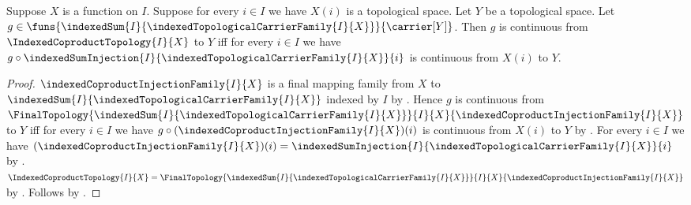 \begin{theorem}\label{indexed_coproduct_topology_universal_property}
    Suppose $X$ is a function on $I$.
    Suppose for every $i\in I$ we have $X(i)$ is a topological space.
    Let $Y$ be a topological space.
    Let $g\in\funs{
        \indexedSum{I}{\indexedTopologicalCarrierFamily{I}{X}}}{
        \carrier[Y]}$.
    Then $g$ is continuous from $\IndexedCoproductTopology{I}{X}$ to $Y$
        iff for every $i\in I$ we have
            $g\circ\indexedSumInjection{I}{
                \indexedTopologicalCarrierFamily{I}{X}}{i}$
            is continuous from $X(i)$ to $Y$.
\end{theorem}
\begin{proof}
    $\indexedCoproductInjectionFamily{I}{X}$ is a final mapping family
        from $X$ to
        $\indexedSum{I}{\indexedTopologicalCarrierFamily{I}{X}}$
        indexed by $I$ by .
    Hence $g$ is continuous from
        $\FinalTopology{
            \indexedSum{I}{
                \indexedTopologicalCarrierFamily{I}{X}}}{I}{X}{
            \indexedCoproductInjectionFamily{I}{X}}$ to $Y$ iff
        for every $i\in I$ we have
            $g\circ(\indexedCoproductInjectionFamily{I}{X})(i)$
            is continuous from $X(i)$ to $Y$ by
        .
    For every $i\in I$ we have
        $(\indexedCoproductInjectionFamily{I}{X})(i)
            =\indexedSumInjection{I}{
                \indexedTopologicalCarrierFamily{I}{X}}{i}$ by
        .
    $\IndexedCoproductTopology{I}{X}
        =\FinalTopology{
            \indexedSum{I}{
                \indexedTopologicalCarrierFamily{I}{X}}}{I}{X}{
            \indexedCoproductInjectionFamily{I}{X}}$ by
        .
    Follows by \auto.
\end{proof}
